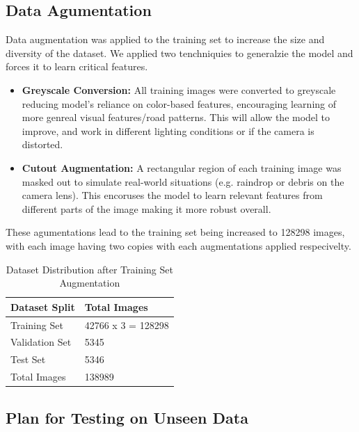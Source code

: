 \documentclass{article} %
\begin{document}
\subsection{Data Agumentation}

Data augmentation was applied to the training set to increase the size and diversity of the dataset. We applied two tenchniquies to generalzie the model and forces
it to learn critical features. 

\begin{itemize}
  \item \textbf{Greyscale Conversion:} All training images were converted to greyscale reducing model's reliance on color-based features, encouraging learning of more genreal visual features/road patterns. This will allow the model to improve, and work in different lighting conditions or if the camera is distorted.

  \item \textbf{Cutout Augmentation:} A rectangular region of each training image was masked out to simulate real-world situations (e.g. raindrop or debris on the camera lens). This encoruses the model to learn relevant features from different parts of the image making it more robust overall. 
\end{itemize}

These agumentations lead to the training set being increased to 128298 images, with each image having two copies with each augmentations applied respecivelty.

\begin{table}[h]
\centering
\caption{Dataset Distribution after Training Set Augmentation}
\vspace{0.5em}
\begin{tabular}{|p{2cm}|p{2cm}|}
\hline
\textbf{Dataset Split} & \textbf{Total Images} \\ \hline
Training Set           & 42766 x 3 =  128298\\ \hline
Validation Set         & 5345 \\ \hline
Test Set               & 5346 \\ \hline
Total Images           & 138989 \\ \hline
\end{tabular}
\end{table}

\subsection{Plan for Testing on Unseen Data}
\end{document}
